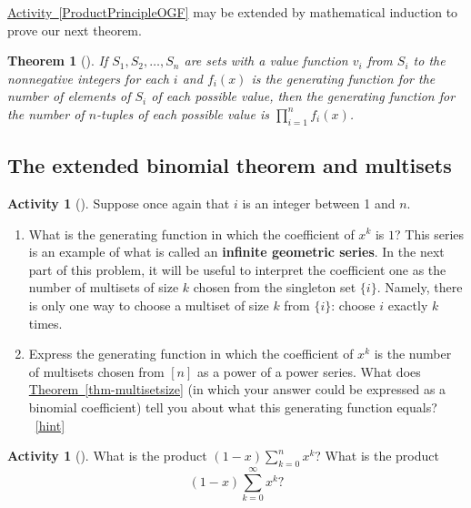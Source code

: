 \documentclass[10pt,]{book}
\newcommand{\terminology}[1]{\textbf{#1}}
\theoremstyle{plain}
\newtheorem{theorem}{Theorem}[section]
\theoremstyle{definition}
\theoremstyle{definition}
\theoremstyle{definition}
\newtheorem{activity}[project]{Activity}
\numberwithin{equation}{chapter}
\begin{document}
\hypertarget{p-886}{}%
\hyperref[ProductPrincipleOGF]{Activity~\ref{ProductPrincipleOGF}} may be extended by mathematical induction to prove our next theorem.%
\begin{theorem}[{}]\label{theorem-6}
\hypertarget{p-887}{}%
If \(S_1,S_2,\dots,S_n\) are sets with a value function \(v_i\) from \(S_i\) to the nonnegative integers for each \(i\) and \(f_i(x)\) is the generating function for the number of elements of \(S_i\) of each possible value, then the generating function for the number of \(n\)-tuples of each possible value is \(\prod_{i=1}^n f_i(x)\).%
\end{theorem}
\typeout{************************************************}
\typeout{************************************************}
\subsection[{The extended binomial theorem and multisets}]{The extended binomial theorem and multisets}\label{subsection-24}
\begin{activity}[]\label{activity-188}
\hypertarget{p-888}{}%
Suppose once again that \(i\) is an integer between 1 and \(n\).%
\begin{enumerate}[font=\bfseries,label=(\alph*),ref=\alph*]
\item\label{task-173} \hypertarget{p-889}{}%
What is the generating function in which the coefficient of \(x^k\) is \(1\)? This series is an example of what is called an \terminology{infinite geometric series}. In the next part of this problem, it will be useful to interpret the coefficient one as the number of multisets of size \(k\) chosen from the singleton set \(\{i\}\). Namely, there is only one way to choose a multiset of size \(k\) from \(\{i\}\): choose \(i\) exactly \(k\) times.%
\item\label{task-174} \hypertarget{p-891}{}%
Express the generating function in which the coefficient of \(x^k\) is the number of multisets chosen from \([n]\) as a power of a power series.  What does \hyperref[thm-multisetsize]{Theorem~\ref{thm-multisetsize}} (in which your answer could be expressed as a binomial coefficient) tell you about what this generating function equals?%
~\hfill{\tiny\hyperlink{a-188.b}{[hint]}\hypertarget{q-188.b}{}}\end{enumerate}
\end{activity}
\begin{activity}[]\label{activity-189}
\hypertarget{p-895}{}%
What is the product \((1-x)\sum_{k=0}^n x^k\)? What is the product%
\begin{equation*}
(1-x)\sum_{k=0}^\infty x^k?
\end{equation*}
%
\end{activity}
\end{document}
